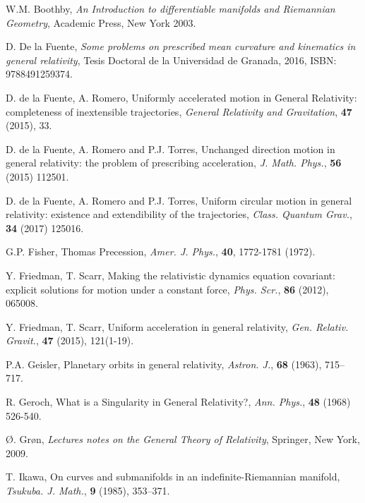 \documentclass[11pt]{book}
\begin{document}
\thispagestyle{empty}

\begin{thebibliography}{999}
	
 W.M. Boothby, {\it An Introduction to differentiable manifolds and Riemannian Geometry}, Academic Press, New York 2003.
	
 D. De la Fuente, {\it Some problems on prescribed mean curvature and kinematics in general relativity}, Tesis Doctoral de la Universidad de Granada, 2016, ISBN: 9788491259374.
	
 D. de la Fuente, A. Romero, {\rm Uniformly accelerated motion in General Relativity: completeness of inextensible trajectories}, {\it General Relativity and Gravitation}, {\bf 47} (2015), 33.
	
 D. de la Fuente, A. Romero and P.J. Torres, {\rm Unchanged direction motion in general relativity: the problem of prescribing acceleration}, {\it J. Math. Phys.}, {\bf 56} (2015) 112501.
	
 D. de la Fuente, A. Romero and P.J. Torres, {\rm Uniform circular motion in general relativity: existence and extendibility of the trajectories}, {\it Class. Quantum Grav.}, {\bf 34} (2017) 125016.

 G.P. Fisher, Thomas Precession, \textit{Amer. J. Phys.}, \textbf{40}, 1772-1781 (1972).

 Y. Friedman, T. Scarr, {\rm Making the relativistic dynamics equation covariant: explicit solutions for motion under a constant force}, {\it Phys. Scr.}, {\bf 86} (2012), 065008.

 Y. Friedman, T. Scarr, Uniform acceleration in general relativity, {\it Gen. Relativ. Gravit.}, {\bf 47} (2015), 121(1-19).

 P.A. Geisler, {\rm Planetary orbits in general relativity}, {\it Astron. J.}, {\bf 68} (1963), 715–717.
	
 R. Geroch, {\rm What is a Singularity in General Relativity?}, {\it Ann. Phys.}, {\bf 48} (1968) 526-540.
	
 \O. Gr\o n, {\it Lectures notes on the General Theory of Relativity}, Springer, New York, 2009.
	
 T. Ikawa, {\rm On curves and submanifolds in an indefinite-Riemannian manifold}, {\it Tsukuba. J. Math.}, {\bf 9} (1985), 353--371.


\end{thebibliography}
\end{document}

